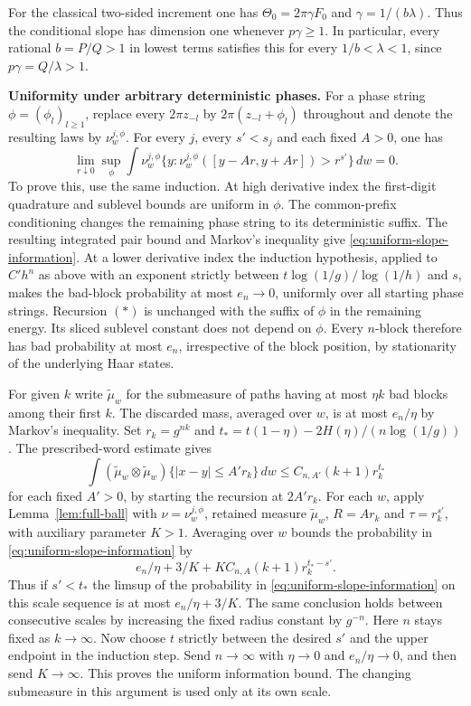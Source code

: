 \documentclass[11pt,a4paper]{article}
\begin{document}
For the classical two-sided increment one has
$\Theta_0=2\pi\gamma F_0$ and $\gamma=1/(b\lambda)$.
Thus the conditional slope has dimension one whenever $p\gamma\ge1$.
In particular, every rational $b=P/Q>1$ in lowest terms satisfies
this for every $1/b<\lambda<1$, since $p\gamma=Q/\lambda>1$.

\par\smallskip\noindent\textbf{Uniformity under arbitrary deterministic phases.}\enspace
For a phase string $\phi=(\phi_l)_{l\ge1}$, replace every
$2\pi z_{-l}$ by $2\pi(z_{-l}+\phi_l)$ throughout and denote the
resulting laws by $\nu^{j,\phi}_w$. For every $j$, every $s'<s_j$
and each fixed $A>0$, one has
\begin{equation}\label{eq:uniform-slope-information}
 \lim_{r\downarrow0}\sup_\phi\int
  \nu^{j,\phi}_w\{y:\nu^{j,\phi}_w([y-Ar,y+Ar])>r^{s'}\}\,dw=0 .
\end{equation}
To prove this, use the same induction. At high derivative index the
first-digit quadrature and sublevel bounds are uniform in $\phi$.
The common-prefix conditioning changes the remaining phase string
to its deterministic suffix. The resulting integrated pair bound
and Markov's inequality give \eqref{eq:uniform-slope-information}.
At a lower derivative index the induction hypothesis, applied to
$C'h^n$ as above with an exponent strictly between
$t\log(1/g)/\log(1/h)$ and $s$, makes the bad-block probability
at most $e_n\to0$, uniformly over all starting phase strings.
Recursion $(*)$ is unchanged with the suffix of $\phi$ in the
remaining energy. Its sliced sublevel constant does not depend on
$\phi$. Every $n$-block therefore has bad probability at most $e_n$,
irrespective of the block position, by stationarity of the underlying
Haar states.

For given $k$ write $\widetilde\mu_w$ for the submeasure of paths
having at most $\eta k$ bad blocks among their first $k$. The
discarded mass, averaged over $w$, is at most $e_n/\eta$ by Markov's
inequality. Set $r_k=g^{nk}$ and
$t_*=t(1-\eta)-2H(\eta)/(n\log(1/g))$. The prescribed-word
estimate gives
\[
 \int(\widetilde\mu_w\otimes\widetilde\mu_w)
       \{|x-y|\le A' r_k\}\,dw\le C_{n,A'}(k+1)r_k^{t_*}
\]
for each fixed $A'>0$, by starting the recursion at $2A'r_k$.
For each $w$, apply Lemma~\ref{lem:full-ball} with
$\nu=\nu^{j,\phi}_w$, retained measure $\widetilde\mu_w$, $R=A r_k$
and $\tau=r_k^{s'}$, with auxiliary parameter $K>1$. Averaging over $w$ bounds the probability in
\eqref{eq:uniform-slope-information} by
\[
 e_n/\eta+3/K+K C_{n,A}(k+1)r_k^{t_*-s'} .
\]
Thus if $s'<t_*$ the limsup of
the probability in \eqref{eq:uniform-slope-information} on this
scale sequence is at most $e_n/\eta+3/K$. The same conclusion holds
between consecutive scales by increasing the fixed radius constant
by $g^{-n}$. Here $n$ stays fixed as $k\to\infty$. Now choose $t$
strictly between the desired $s'$ and the upper endpoint in the
induction step. Send $n\to\infty$ with $\eta\to0$ and
$e_n/\eta\to0$, and then send $K\to\infty$. This proves the
uniform information bound. The changing submeasure in this argument
is used only at its own scale.
\end{document}
